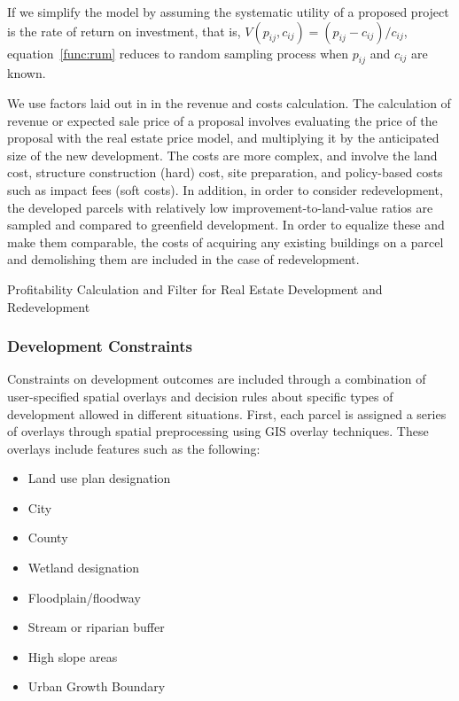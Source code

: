 If we simplify the model by assuming the systematic utility
of a proposed project is the rate of return on investment,
that is, $V(p_{ij}, c_{ij}) = (p_{ij} - c_{ij}) / c_{ij}$,
equation~\ref{func:rum} reduces to random sampling process when
$p_{ij}$ and $c_{ij}$ are known.

We use factors laid out in \cite{Waddell2001a} in the
revenue and costs calculation.  The calculation of revenue
or expected sale price of a proposal involves evaluating the
price of the proposal with the real estate price model, and
multiplying it by the anticipated size of the new
development.  The costs are more complex, and involve
the land cost, structure construction (hard) cost, site
preparation, and policy-based costs such as impact fees
(soft costs).  In addition, in order to consider
redevelopment, the developed parcels with relatively low
improvement-to-land-value ratios are sampled and compared to
greenfield development.  In order to equalize these and make
them comparable, the costs of acquiring any existing
buildings on a parcel and demolishing them are included in
the case of redevelopment.

\begin{table}[ht]
\label{tab:profit-filter}
\begin{center}
  \caption{Profitability Calculation and Filter for Real
    Estate Development and Redevelopment }

\end{center}
\end{table}


\subsubsection{Development Constraints} \label{sec-development-constraints}
Constraints on development outcomes are included through a
combination of user-specified spatial overlays and decision rules
about specific types of development allowed in different
situations.  First, each parcel is assigned a series of overlays
through spatial preprocessing using GIS overlay techniques.  These
overlays include features such as the following:

\begin{itemize}
\item  Land use plan designation
\item  City
\item  County
\item  Wetland designation
\item  Floodplain/floodway
\item  Stream or riparian buffer
\item  High slope areas
\item  Urban Growth Boundary
\end{itemize}

